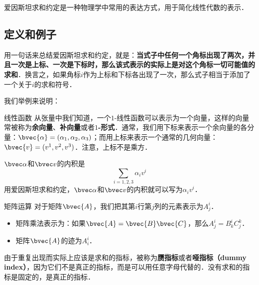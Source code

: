 
爱因斯坦求和约定是一种物理学中常用的表达方式，用于简化线性代数的表示．

\subsection{定义和例子}

用一句话来总结爱因斯坦求和约定，就是：\textbf{当式子中任何一个角标出现了两次，并且一次是上标、一次是下标时，那么该式表示的实际上是对这个角标一切可能值的求和}．换言之，如果角标$i$作为上标和下标各出现了一次，那么式子相当于添加了一个关于$i$的求和符号．

我们举例来说明：

\begin{example}{线性函数}
从张量中我们知道，一个$1$-线性函数可以表示为一个向量，这样的向量常被称为\textbf{余向量}、\textbf{补向量}或者\textbf{$1$-形式}．通常，我们用下标来表示一个余向量的各分量：$\bvec{\alpha}=(\alpha_1, \alpha_2, \alpha_3)$；而用上标来表示一个通常的几何向量：$\bvec{v}=(v^1, v^2, v^3)$．注意，上标不是乘方．

$\bvec\alpha$和$\bvec v$的内积是$$\sum\limits_{i=1, 2, 3}\alpha_i v^i$$
用爱因斯坦求和约定，$\bvec\alpha$和$\bvec v$的内积就可以写为$\alpha_i v^i$．
\end{example}

\begin{example}{矩阵运算}
对于矩阵$\bvec{A}$，我们把其第$i$行第$j$列的元素表示为$A^i_j$．
\begin{itemize}
\item 矩阵乘法表示为：如果$\bvec{A}=\bvec{B}\bvec{C}$，那么$A^i_j=B^i_k C^k_j$．
\item 矩阵$\bvec{A}$的迹为$A^i_i$．

\end{itemize}
\end{example}

由于重复出现而实际上应该是求和的指标，被称为\textbf{赝指标}或者\textbf{哑指标（dummy index）}，因为它们不是真正的指标，而是可以用任意字母代替的．没有求和的指标是固定的，是真正的指标．

